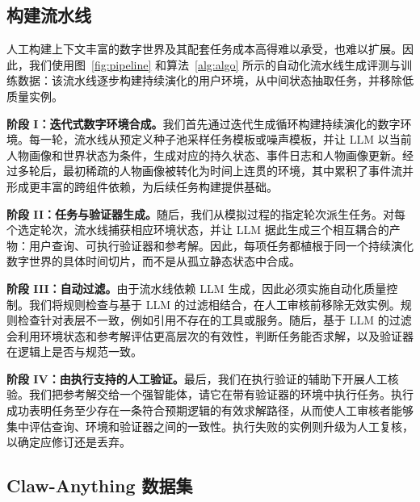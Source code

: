 \documentclass[10pt]{article}
\begin{document}
\subsection{构建流水线}
\label{sec:construction}

人工构建上下文丰富的数字世界及其配套任务成本高得难以承受，也难以扩展。因此，我们使用图~\ref{fig:pipeline} 和算法~\ref{alg:algo} 所示的自动化流水线生成评测与训练数据：该流水线逐步构建持续演化的用户环境，从中间状态抽取任务，并移除低质量实例。

\textbf{阶段 I：迭代式数字环境合成。}我们首先通过迭代生成循环构建持续演化的数字环境。每一轮，流水线从预定义种子池采样任务模板或噪声模板，并让 LLM 以当前人物画像和世界状态为条件，生成对应的持久状态、事件日志和人物画像更新。经过多轮后，最初稀疏的人物画像被转化为时间上连贯的环境，其中累积了事件流并形成更丰富的跨组件依赖，为后续任务构建提供基础。

\textbf{阶段 II：任务与验证器生成。}随后，我们从模拟过程的指定轮次派生任务。对每个选定轮次，流水线捕获相应环境状态，并让 LLM 据此生成三个相互耦合的产物：用户查询、可执行验证器和参考解。因此，每项任务都植根于同一个持续演化数字世界的具体时间切片，而不是从孤立静态状态中合成。

\textbf{阶段 III：自动过滤。}由于流水线依赖 LLM 生成，因此必须实施自动化质量控制。我们将规则检查与基于 LLM 的过滤相结合，在人工审核前移除无效实例。规则检查针对表层不一致，例如引用不存在的工具或服务。随后，基于 LLM 的过滤会利用环境状态和参考解评估更高层次的有效性，判断任务能否求解，以及验证器在逻辑上是否与规范一致。

\textbf{阶段 IV：由执行支持的人工验证。}最后，我们在执行验证的辅助下开展人工核验。我们把参考解交给一个强智能体，请它在带有验证器的环境中执行任务。执行成功表明任务至少存在一条符合预期逻辑的有效求解路径，从而使人工审核者能够集中评估查询、环境和验证器之间的一致性。执行失败的实例则升级为人工复核，以确定应修订还是丢弃。

\subsection{Claw-Anything 数据集}
\label{sec:bench-stats}
\end{document}
